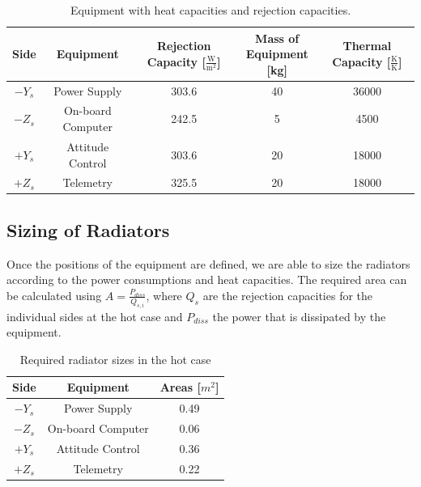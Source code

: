 \begin{table}[H]
\centering
\begin{tabular}{ | c| c|c|c|c|}
\hline 
Side & Equipment  & Rejection Capacity [$\frac{\mathrm{W}}{\mathrm{m}^{2}} $] & \specialcell{Mass of \\Equipment [kg]} & Thermal Capacity [$\frac{\mathrm{K}}{\mathrm{K}}$]   \\ \hline
$-Y_{s}$ & Power Supply & 303.6 & 40 &  36000   \\ \hline
$-Z_{s}$ &On-board Computer&  242.5 & 5 & 4500 \\\hline
$+Y_{s}$ &Attitude Control  &  303.6 & 20& 18000 \\ \hline
$+Z_{s}$ &Telemetry & 325.5 & 20 &  18000 \\ \hline
\end{tabular}
\caption{Equipment with heat capacities and rejection capacities.}
\label{tab:heatcapacities}
\end{table} 

\subsection{Sizing of Radiators}
Once  the positions of the equipment are defined, we are able to size the radiators according to the power consumptions and heat capacities. The required area can be calculated using $A=\frac{P_{diss}}{Q_{s,i}}$, where $Q_{s}$ are the rejection capacities for the individual sides at the hot case and $P_{diss}$ the power that is dissipated by the equipment.


\begin{table}[H]
\centering
\begin{tabular}{ | c| c| c| }
\hline 
Side & Equipment  & Areas [$m^{2}$] \\ \hline
$-Y_{s}$ & Power Supply & 0.49   \\ \hline
$-Z_{s}$ &On-board Computer & 0.06   \\\hline
$+Y_{s}$ &Attitude Control &  0.36 \\ \hline
$+Z_{s}$ &Telemetry  &    0.22 \\ \hline
\end{tabular}
\caption{Required radiator sizes in the hot case}
\label{tab:arrangement}
\end{table}

 
